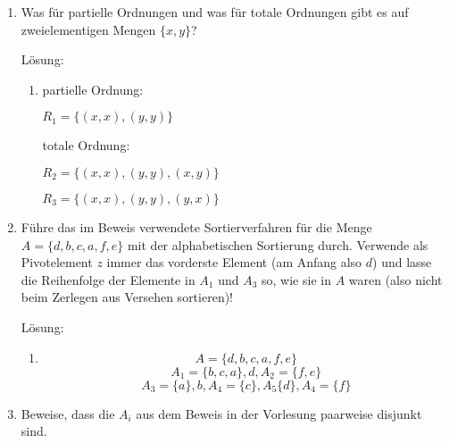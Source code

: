 \documentclass[main.tex]{subfiles}
\begin{document}
\begin{enumerate}
	\item Was für partielle Ordnungen und was für totale Ordnungen gibt es
	      auf zweielementigen Mengen \( \{x, y\} \)?

	      Lösung:
	      \begin{enumerate}
		      \item partielle Ordnung:

		            \( R_1 = \{ (x,x), (y,y) \}  \)

		            totale Ordnung:

		            \( R_2 = \{ (x, x), (y, y), (x, y) \}  \)

		            \( R_3 = \{ (x, x), (y, y), (y, x) \}  \)
	      \end{enumerate}
	\item Führe das im Beweis verwendete Sortierverfahren für die Menge \( A = \{ d, b, c, a, f, e \} \)
	      mit der alphabetischen Sortierung durch. Verwende als Pivotelement \( z \) immer
	      das vorderste Element (am Anfang also \( d \)) und lasse die Reihenfolge der
	      Elemente in \( A_1 \) und \( A_3 \) so, wie sie in \( A \) waren (also nicht beim Zerlegen aus
	      Versehen sortieren)!

	      Lösung:
	      \begin{enumerate}
		      \item \[ A = \{ d, b, c, a, f, e \} \]
		            \[ A_1 = \{b, c, a \}, d, A_2 = \{ f,e \} \]
		            \[ A_3 = \{ a \}, b,  A_4 = \{ c \}, A_5\{ d \}, A_4 = \{ f \} \]
	      \end{enumerate}
	\item Beweise, dass die \( A_i \) aus dem Beweis in der Vorlesung paarweise disjunkt sind.


\end{enumerate}
\end{document}
